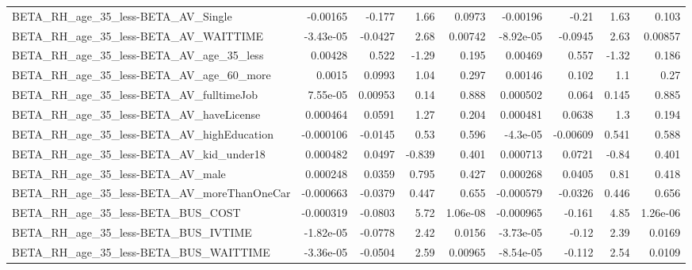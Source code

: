 \begin{tabular}{lrrrrrrrr}
BETA\_RH\_age\_35\_less-BETA\_AV\_Single                 &    -0.00165 &       -0.177 &     1.66 &   0.0973 &   -0.00196 &       -0.21 &         1.63 &         0.103 \\
BETA\_RH\_age\_35\_less-BETA\_AV\_WAITTIME               &   -3.43e-05 &      -0.0427 &     2.68 &  0.00742 &  -8.92e-05 &     -0.0945 &         2.63 &       0.00857 \\
BETA\_RH\_age\_35\_less-BETA\_AV\_age\_35\_less            &     0.00428 &        0.522 &    -1.29 &    0.195 &    0.00469 &       0.557 &        -1.32 &         0.186 \\
BETA\_RH\_age\_35\_less-BETA\_AV\_age\_60\_more            &      0.0015 &       0.0993 &     1.04 &    0.297 &    0.00146 &       0.102 &          1.1 &          0.27 \\
BETA\_RH\_age\_35\_less-BETA\_AV\_fulltimeJob            &    7.55e-05 &      0.00953 &     0.14 &    0.888 &   0.000502 &       0.064 &        0.145 &         0.885 \\
BETA\_RH\_age\_35\_less-BETA\_AV\_haveLicense            &    0.000464 &       0.0591 &     1.27 &    0.204 &   0.000481 &      0.0638 &          1.3 &         0.194 \\
BETA\_RH\_age\_35\_less-BETA\_AV\_highEducation          &   -0.000106 &      -0.0145 &     0.53 &    0.596 &   -4.3e-05 &    -0.00609 &        0.541 &         0.588 \\
BETA\_RH\_age\_35\_less-BETA\_AV\_kid\_under18            &    0.000482 &       0.0497 &   -0.839 &    0.401 &   0.000713 &      0.0721 &        -0.84 &         0.401 \\
BETA\_RH\_age\_35\_less-BETA\_AV\_male                   &    0.000248 &       0.0359 &    0.795 &    0.427 &   0.000268 &      0.0405 &         0.81 &         0.418 \\
BETA\_RH\_age\_35\_less-BETA\_AV\_moreThanOneCar         &   -0.000663 &      -0.0379 &    0.447 &    0.655 &  -0.000579 &     -0.0326 &        0.446 &         0.656 \\
BETA\_RH\_age\_35\_less-BETA\_BUS\_COST                  &   -0.000319 &      -0.0803 &     5.72 & 1.06e-08 &  -0.000965 &      -0.161 &         4.85 &      1.26e-06 \\
BETA\_RH\_age\_35\_less-BETA\_BUS\_IVTIME                &   -1.82e-05 &      -0.0778 &     2.42 &   0.0156 &  -3.73e-05 &       -0.12 &         2.39 &        0.0169 \\
BETA\_RH\_age\_35\_less-BETA\_BUS\_WAITTIME              &   -3.36e-05 &      -0.0504 &     2.59 &  0.00965 &  -8.54e-05 &      -0.112 &         2.54 &        0.0109 \\

\end{tabular}

